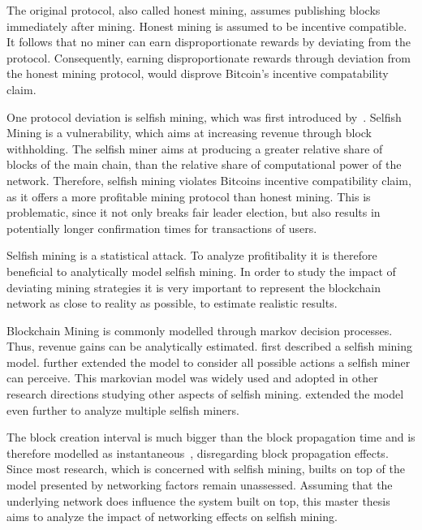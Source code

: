 The original protocol, also called honest mining, assumes publishing blocks immediately after mining. Honest mining is assumed to be incentive compatible. It follows that no miner can earn disproportionate rewards by deviating from the protocol.
Consequently, earning disproportionate rewards through deviation from the honest mining protocol, would disprove Bitcoin's incentive compatability claim.

One protocol deviation is selfish mining, which was first introduced by~\citeauthor{eyal}.
Selfish Mining is a vulnerability, which aims at increasing revenue through block withholding. The selfish miner aims at producing a greater relative share of blocks of the main chain, than the relative share of computational power of the network. Therefore, selfish mining violates Bitcoins incentive compatibility claim, as it offers a more profitable mining protocol than honest mining. This is problematic, since it not only breaks fair leader election, but also results in potentially longer confirmation times for transactions of users.

Selfish mining is a statistical attack. To analyze profitibality it is therefore beneficial to analytically model selfish mining. In order to study the impact of deviating mining strategies it is very important to represent the blockchain network as close to reality as possible, to estimate realistic results.

Blockchain Mining is commonly modelled through markov decision processes.
Thus, revenue gains can be analytically estimated. \citeauthor{eyal} first described a selfish mining model. \citeauthor{optimal_sm} further extended the model to consider all possible actions a selfish miner can perceive. This markovian model was widely used and adopted in other research directions studying other aspects of selfish mining. \citeauthor{deepDiveSM} extended the model even further to analyze multiple selfish miners. 

The block creation interval is much bigger than the block propagation time and is therefore modelled as instantaneous~\cite{optimal_sm}, disregarding block propagation effects. Since most research, which is concerned with selfish mining, builts on top of the model presented by \citeauthor{optimal_sm} networking factors remain unassessed. Assuming that the underlying network does influence the system built on top, this master thesis aims to analyze the impact of networking effects on selfish mining.






